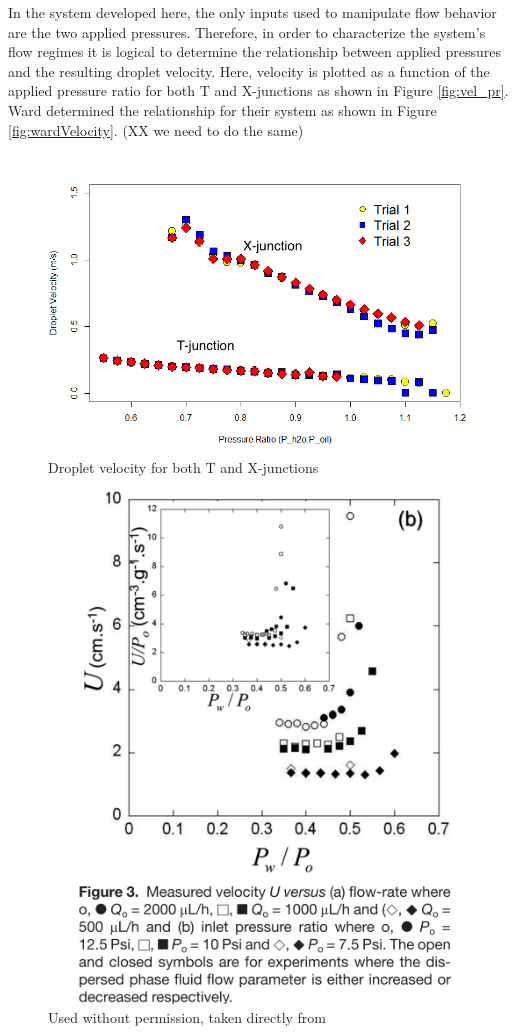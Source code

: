 In the system developed here, the only inputs used to manipulate flow behavior are the two applied pressures. Therefore, in order to characterize the system's flow regimes it is logical to determine the relationship between applied pressures and the resulting droplet velocity. Here, velocity is plotted as a function of the applied pressure ratio for both T and X-junctions as shown in Figure \vref{fig:vel_pr}.  Ward determined the relationship for their system as shown in Figure \vref{fig:wardVelocity}. (XX we need to do the same)

\begin{figure}[h]
\centering 
\includegraphics[width=01.0\columnwidth]{vel_pr.PNG} 
\caption[Droplet Velocity as a function of Applied Control Pressure Ratio]{Droplet velocity for both T and X-junctions }
\label{fig:vel_pr} 
\end{figure}


\begin{figure}[h]
\centering 
\includegraphics[width=0.75\columnwidth]{wardVelocity.PNG} 
\caption[Velocity, U as a function of applied pressure]{Used without permission, taken directly from \cite{Ward2005} }
\label{fig:wardVelocity} 
\end{figure}




